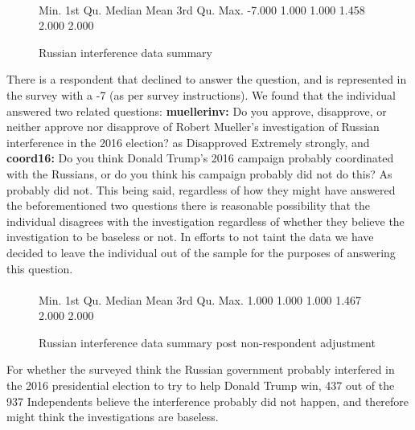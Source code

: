 \documentclass[12pt]{article}
\begin{document}
\paragraph{}
\begin{figure}[H]
\begin{Schunk}
\begin{Soutput}
   Min. 1st Qu.  Median    Mean 3rd Qu.    Max. 
 -7.000   1.000   1.000   1.458   2.000   2.000 
\end{Soutput}
\end{Schunk}
\caption{Russian interference data summary}
\end{figure}

There is a respondent that declined to answer the question, and is represented in the survey with a -7 (as per survey instructions). We found that the individual answered two related questions: \textbf{muellerinv:} Do you approve, disapprove, or neither approve nor disapprove of Robert Mueller’s investigation of Russian interference in the 2016 election? as Disapproved Extremely strongly, and \textbf{coord16:} Do you think Donald Trump’s 2016 campaign probably coordinated with the Russians, or do you think his campaign probably did not do this? As probably did not. This being said, regardless of how they might have answered the beforementioned two questions there is reasonable possibility that the individual disagrees with the investigation regardless of whether they believe the investigation to be baseless or not. In efforts to not taint the data we have decided to leave the individual out of the sample for the purposes of answering this question. 

\paragraph{}
\begin{figure}[H]
\begin{Schunk}
\begin{Soutput}
   Min. 1st Qu.  Median    Mean 3rd Qu.    Max. 
  1.000   1.000   1.000   1.467   2.000   2.000 
\end{Soutput}
\end{Schunk}
\caption{Russian interference data summary post non-respondent adjustment}
\end{figure}

For whether the surveyed think the Russian government probably interfered in the 2016 presidential election to try to help Donald Trump win, 437 out of the 937 Independents believe the interference probably did not happen, and therefore might think the investigations are baseless.
\end{document}
